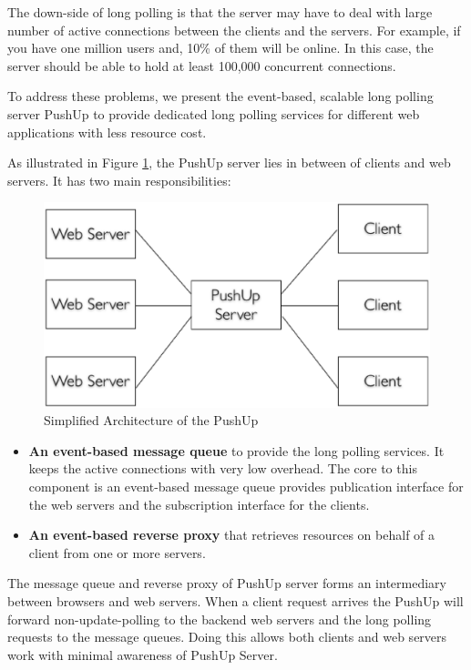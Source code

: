 The down-side of long polling is that the server may have to deal with large
number of active connections between the clients and the servers. For example,
if you have one million users and, 10\% of them will be online. In this case,
the server should be able to hold at least 100,000 concurrent connections.

To address these problems, we present the event-based\cite{UnixBook}, scalable
long polling server PushUp to provide dedicated long polling services for 
different web applications with less resource cost.

As illustrated in Figure \ref{fig:sim_pushup}, the PushUp server lies in 
between of clients and web servers. It has two main responsibilities:
\begin{figure}[htb!]
\centering
    \includegraphics[scale=0.40]{figures/sim_pushup.eps}
    \caption{Simplified Architecture of the PushUp}
    \label{fig:sim_pushup}
\end{figure}

\begin {itemize}
\item {\bf An event-based message queue}\cite{PubSub} to provide the long 
polling services. It keeps the active connections with very low overhead.
The core to this component is an event-based message queue provides
publication interface for the web servers and the subscription interface
for the clients.
\item {\bf An event-based reverse proxy}\cite{ReverseProxy} that retrieves 
resources on behalf of a client from one or more servers.
\end {itemize}

The message queue and reverse proxy of PushUp server forms an intermediary
between browsers and web servers. When a client request arrives the PushUp
will forward non-update-polling to the backend web servers and the long 
polling requests to the message queues. Doing this allows both clients and
web servers work with minimal awareness of PushUp Server. 
